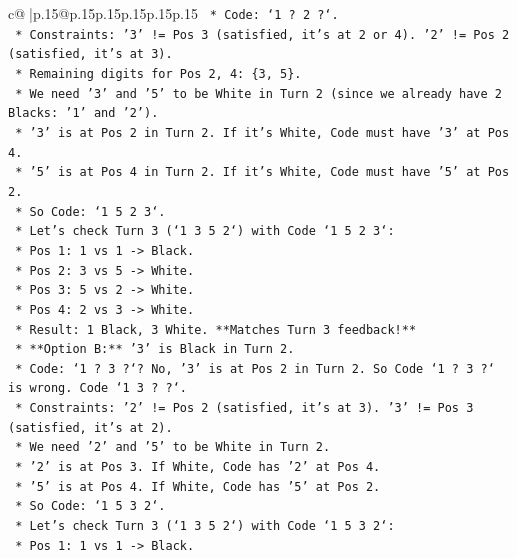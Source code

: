 \documentclass{article}
\begin{document}
{\begin{supertabular}{c@{$\;$}|p{.15\linewidth}@{}p{.15\linewidth}p{.15\linewidth}p{.15\linewidth}p{.15\linewidth}p{.15\linewidth}}
{{{\texttt{                *   Code: `1 ? 2 ?`.} \\
\texttt{                *   Constraints: '3' != Pos 3 (satisfied, it's at 2 or 4). '2' != Pos 2 (satisfied, it's at 3).} \\
\texttt{                *   Remaining digits for Pos 2, 4: \{3, 5\}.} \\
\texttt{                *   We need '3' and '5' to be White in Turn 2 (since we already have 2 Blacks: '1' and '2').} \\
\texttt{                *   '3' is at Pos 2 in Turn 2. If it's White, Code must have '3' at Pos 4.} \\
\texttt{                *   '5' is at Pos 4 in Turn 2. If it's White, Code must have '5' at Pos 2.} \\
\texttt{                *   So Code: `1 5 2 3`.} \\
\texttt{                *   Let's check Turn 3 (`1 3 5 2`) with Code `1 5 2 3`:} \\
\texttt{                    *   Pos 1: 1 vs 1 {-}> Black.} \\
\texttt{                    *   Pos 2: 3 vs 5 {-}> White.} \\
\texttt{                    *   Pos 3: 5 vs 2 {-}> White.} \\
\texttt{                    *   Pos 4: 2 vs 3 {-}> White.} \\
\texttt{                    *   Result: 1 Black, 3 White. **Matches Turn 3 feedback!**} \\
\texttt{            *   **Option B:** '3' is Black in Turn 2.} \\
\texttt{                *   Code: `1 ? 3 ?`? No, '3' is at Pos 2 in Turn 2. So Code `1 ? 3 ?` is wrong. Code `1 3 ? ?`.} \\
\texttt{                *   Constraints: '2' != Pos 2 (satisfied, it's at 3). '3' != Pos 3 (satisfied, it's at 2).} \\
\texttt{                *   We need '2' and '5' to be White in Turn 2.} \\
\texttt{                *   '2' is at Pos 3. If White, Code has '2' at Pos 4.} \\
\texttt{                *   '5' is at Pos 4. If White, Code has '5' at Pos 2.} \\
\texttt{                *   So Code: `1 5 3 2`.} \\
\texttt{                *   Let's check Turn 3 (`1 3 5 2`) with Code `1 5 3 2`:} \\
\texttt{                    *   Pos 1: 1 vs 1 {-}> Black.} \\
}}}
\end{supertabular}}
\end{document}
